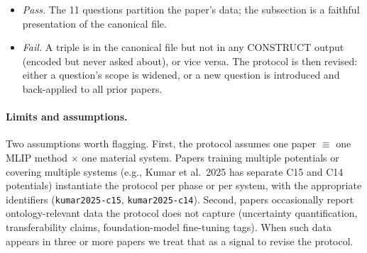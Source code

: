 \begin{itemize}
\item \emph{Pass.} The 11 questions partition the paper's data; the
  subsection is a faithful presentation of the canonical file.
\item \emph{Fail.} A triple is in the canonical file but not in any
  CONSTRUCT output (encoded but never asked about), or vice versa.
  The protocol is then revised: either a question's scope is
  widened, or a new question is introduced and back-applied to all
  prior papers.
\end{itemize}

\paragraph{Limits and assumptions.}
Two assumptions worth flagging. First, the protocol assumes one
paper $\equiv$ one MLIP method $\times$ one material system. Papers
training multiple potentials or covering multiple systems
(e.g., Kumar et al.~2025 has separate C15 and C14 potentials)
instantiate the protocol per phase or per system, with the
appropriate identifiers (\texttt{kumar2025-c15},
\texttt{kumar2025-c14}). Second, papers occasionally report
ontology-relevant data the protocol does not capture (uncertainty
quantification, transferability claims, foundation-model fine-tuning
tags). When such data appears in three or more papers we treat that
as a signal to revise the protocol.























